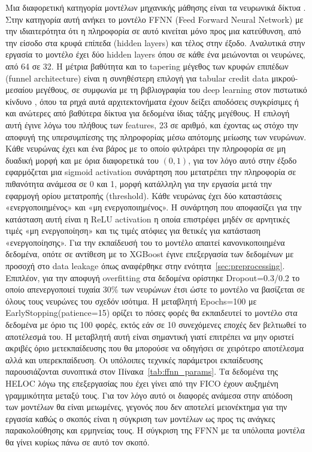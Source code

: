 Μια διαφορετική κατηγορία μοντέλων μηχανικής μάθησης είναι τα νευρωνικά δίκτυα \citep{goodfellow2016deep}.
Στην κατηγορία αυτή ανήκει το μοντέλο FFNN (Feed Forward Neural Network) με την
ιδιαιτερότητα ότι η πληροφορία σε αυτό κινείται μόνο προς μια κατεύθυνση, από
την είσοδο στα κρυφά επίπεδα (hidden layers) και τέλος στην έξοδο. Αναλυτικά
στην εργασία το μοντέλο έχει δύο hidden layers όπου σε κάθε ένα μειώνονται οι
νευρώνες, από 64 σε 32. Η μέτρια βαθύτητα και το tapering μέγεθος των κρυφών επιπέδων 
(funnel architecture) είναι η συνηθέστερη επιλογή για tabular credit data μικρού-μεσαίου 
μεγέθους, σε συμφωνία με τη βιβλιογραφία του deep learning στον πιστωτικό κίνδυνο \citep{gunnarsson2021deep, west2000neural}, 
όπου τα ρηχά αυτά αρχιτεκτονήματα έχουν δείξει αποδόσεις συγκρίσιμες ή και ανώτερες από βαθύτερα δίκτυα για δεδομένα ίδιας τάξης μεγέθους.
Η επιλογή αυτή έγινε λόγω του πλήθους των features,
23 σε αριθμό, και έχοντας ως στόχο την αποφυγή της υπερσυμπίεσης της πληροφορίας
μέσω απότομης μείωσης των νευρώνων. Κάθε νευρώνας έχει και ένα βάρος με το οποίο
φιλτράρει την πληροφορία σε μη δυαδική μορφή και με όρια διαφορετικά του $(0,1)$,
για τον λόγο αυτό στην έξοδο εφαρμόζεται μια sigmoid activation συνάρτηση που
μετατρέπει την πληροφορία σε πιθανότητα ανάμεσα σε 0 και 1, μορφή κατάλληλη για
την εργασία μετά την εφαρμογή ορίου μετατροπής (threshold). Κάθε νευρώνας έχει
δύο καταστάσεις «ενεργοποιημένος» και «μη ενεργοποιημένος». Η συνάρτηση που
αποφασίζει για την κατάσταση αυτή είναι η ReLU activation \citep{glorot2011deep} η οποία επιστρέφει
μηδέν σε αρνητικές τιμές «μη ενεργοποίηση» και τις τιμές ατόφιες για θετικές
για κατάσταση «ενεργοποίησης». Για την εκπαίδευσή του το μοντέλο απαιτεί
κανονικοποιημένα δεδομένα, οπότε σε αντίθεση με το XGBoost έγινε επεξεργασία
των δεδομένων με προσοχή στο data leakage όπως αναφέρθηκε στην
ενότητα~\ref{sec:preprocessing}. Επιπλέον, για την αποφυγή overfitting στα
δεδομένα ορίστηκε Dropout=0.3/0.2 \citep{srivastava2014dropout} το οποίο απενεργοποιεί τυχαία 30\% των νευρώνων
έτσι ώστε το μοντέλο να βασίζεται σε όλους τους νευρώνες του σχεδόν ισότιμα.
Η μεταβλητή Epochs=100 με EarlyStopping(patience=15) \citep{prechelt1998early} ορίζει το πόσες φορές θα
εκπαιδευτεί το μοντέλο στα δεδομένα με όριο τις 100 φορές, εκτός εάν σε 10
συνεχόμενες εποχές δεν βελτιωθεί το αποτέλεσμά του. Η μεταβλητή αυτή είναι
σημαντική γιατί επιτρέπει να μην οριστεί ακριβές όριο μετεκπαίδευσης που θα
μπορούσε να οδηγήσει σε χειρότερο αποτέλεσμα αλλά και υπερεκπαίδευση. Οι
υπόλοιπες τεχνικές παράμετροι εκπαίδευσης παρουσιάζονται συνοπτικά στον
Πίνακα~\ref{tab:ffnn_params}. Τα δεδομένα της HELOC λόγω της επεξεργασίας που
έχει γίνει από την FICO έχουν αυξημένη γραμμικότητα μεταξύ τους. Για τον λόγο
αυτό οι διαφορές ανάμεσα στην απόδοση των μοντέλων θα είναι μειωμένες, γεγονός
που δεν αποτελεί μειονέκτημα για την εργασία καθώς ο σκοπός είναι η σύγκριση
των μοντέλων ως προς τις ανάγκες παρακολούθησης και ερμηνείας τους. Η σύγκριση
της FFNN με τα υπόλοιπα μοντέλα θα γίνει κυρίως πάνω σε αυτό τον σκοπό.

